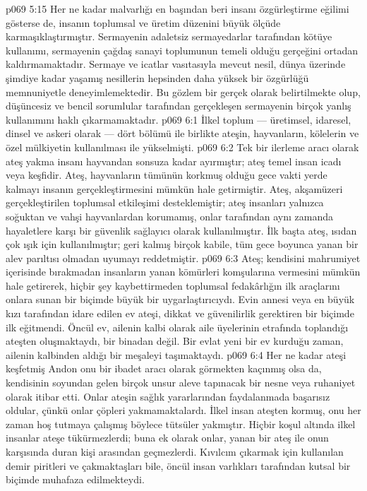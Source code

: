 \vs p069 5:15 Her ne kadar malvarlığı en başından beri insanı özgürleştirme eğilimi gösterse de, insanın toplumsal ve üretim düzenini büyük ölçüde karmaşıklaştırmıştır. Sermayenin adaletsiz sermayedarlar tarafından kötüye kullanımı, sermayenin çağdaş sanayi toplumunun temeli olduğu gerçeğini ortadan kaldırmamaktadır. Sermaye ve icatlar vasıtasıyla mevcut nesil, dünya üzerinde şimdiye kadar yaşamış nesillerin hepsinden daha yüksek bir özgürlüğü memnuniyetle deneyimlemektedir. Bu gözlem bir gerçek olarak belirtilmekte olup, düşüncesiz ve bencil sorumlular tarafından gerçekleşen sermayenin birçok yanlış kullanımını haklı çıkarmamaktadır.
\vs p069 6:1 İlkel toplum --- üretimsel, idaresel, dinsel ve askeri olarak --- dört bölümü ile birlikte ateşin, hayvanların, kölelerin ve özel mülkiyetin kullanılması ile yükselmişti.
\vs p069 6:2 Tek bir ilerleme aracı olarak ateş yakma insanı hayvandan sonsuza kadar ayırmıştır; ateş temel insan icadı veya keşfidir. Ateş, hayvanların tümünün korkmuş olduğu gece vakti yerde kalmayı insanın gerçekleştirmesini mümkün hale getirmiştir. Ateş, akşamüzeri gerçekleştirilen toplumsal etkileşimi desteklemiştir; ateş insanları yalnızca soğuktan ve vahşi hayvanlardan korumamış, onlar tarafından aynı zamanda hayaletlere karşı bir güvenlik sağlayıcı olarak kullanılmıştır. İlk başta ateş, ısıdan çok ışık için kullanılmıştır; geri kalmış birçok kabile, tüm gece boyunca yanan bir alev parıltısı olmadan uyumayı reddetmiştir.
\vs p069 6:3 Ateş; kendisini mahrumiyet içerisinde bırakmadan insanların yanan kömürleri komşularına vermesini mümkün hale getirerek, hiçbir şey kaybettirmeden toplumsal fedakârlığın ilk araçlarını onlara sunan bir biçimde büyük bir uygarlaştırıcıydı. Evin annesi veya en büyük kızı tarafından idare edilen ev ateşi, dikkat ve güvenilirlik gerektiren bir biçimde ilk eğitmendi. Öncül ev, ailenin kalbi olarak aile üyelerinin etrafında toplandığı ateşten oluşmaktaydı, bir binadan değil. Bir evlat yeni bir ev kurduğu zaman, ailenin kalbinden aldığı bir meşaleyi taşımaktaydı.
\vs p069 6:4 Her ne kadar ateşi keşfetmiş Andon onu bir ibadet aracı olarak görmekten kaçınmış olsa da, kendisinin soyundan gelen birçok unsur aleve tapınacak bir nesne veya ruhaniyet olarak itibar etti. Onlar ateşin sağlık yararlarından faydalanmada başarısız oldular, çünkü onlar çöpleri yakmamaktalardı. İlkel insan ateşten kormuş, onu her zaman hoş tutmaya çalışmış böylece tütsüler yakmıştır. Hiçbir koşul altında ilkel insanlar ateşe tükürmezlerdi; buna ek olarak onlar, yanan bir ateş ile onun karşısında duran kişi arasından geçmezlerdi. Kıvılcım çıkarmak için kullanılan demir piritleri ve çakmaktaşları bile, öncül insan varlıkları tarafından kutsal bir biçimde muhafaza edilmekteydi.
